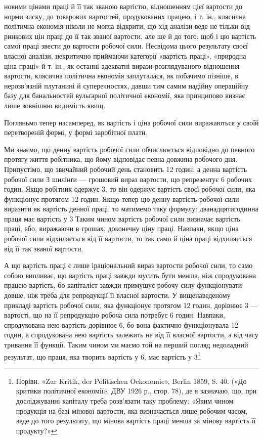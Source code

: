 \parcont{}  %
новими цінами праці й її так званою вартістю, відношенням цієї
вартости до норми зиску, до товарових вартостей, продукованих
працею, і т. ін., клясична політична економія ніколи не могла
відкрити, що хід аналізи веде не тільки від ринкових цін праці
до її так званої вартости, але ще й до того, щоб і цю вартість
самої праці звести до вартости робочої сили. Несвідома цього
результату своєї власної аналізи, некритично приймаючи категорії
«вартість праці», «природна ціна праці» й т. ін., як останні
адекватні вирази розглядуваного відношення вартости, клясична
політична економія заплуталася, як побачимо пізніше, в нерозв’язній
плутанині й суперечностях, давши тим самим надійну
операційну базу для банальностей вульґарної політичної економії,
яка принципово визнає лише зовнішню видимість явищ.

Погляньмо тепер насамперед, як вартість і ціна робочої сили
виражаються у своїй перетвореній формі, у формі заробітної
плати.

Ми знаємо, що денну вартість робочої сили обчислюється
відповідно до певного протягу життя робітника, що йому відповідає
певна довжина робочого дня. Припустімо, що звичайний
робочий день становить 12 годин, а денна вартість робочої сили
З шилінґи — грошовий вираз вартости, що репрезентує 6 робочих
годин. Якщо робітник одержує 3, то він одержує вартість
своєї робочої сили, яка функціонує протягом 12 годин.
Якщо тепер цю денну вартість робочої сили виразити як вартість
денної праці, то матимемо таку формулу: дванадцятигодинна
праця має вартість у 3 Таким чином вартість
робочої сили визначає вартість праці, або, виражаючи в грошах,
доконечну ціну праці. Навпаки, якщо ціна робочої сили
відхиляється від її вартости, то так само й ціна праці відхиляється
від її так званої вартости.

А що вартість праці є лише іраціональний вираз вартости
робочої сили, то само собою випливає, що вартість праці завжди
мусить бути менша, ніж спродукована працею вартість, бо капіталіст
завжди примушує робочу силу функціонувати довше,
ніж треба для репродукції її власної вартости. У вищенаведеному
прикладі вартість робочої сили, яка функціонує протягом
12 годин, дорівнює 3 — вартості, що на її репродукцію
робоча сила потребує 6 годин. Навпаки, спродукована
нею вартість дорівнює 6, бо вона фактично функціонувала
12 годин, а спродукована нею вартість залежить не від її
власної вартости, а від часу тривання її функції. Таким чином
ми маємо той на перший погляд недоладний результат, що праця,
яка творить вартість у 6, має вартість у 3\footnote{
Порівн. «Zur Kritik, der Politischen Oekonomie», Berlin 1859,
S. 40. («До критики політичної економії», ДВУ 1926 р., стор. 78), де я
зазначаю, що, при досліджуванні капіталу треба розв’язати таку проблему:
«Яким чином продукція на базі мінової вартости, яка визначається
лише робочим часом, веде до того результату, що мінова вартість
праці менша за мінову вартість її продукту?»
}
